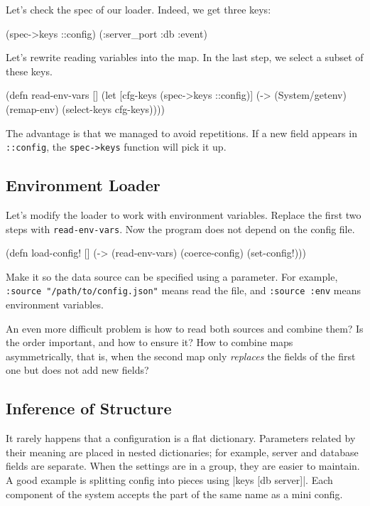 \fi

\noindent
Let's check the spec of our loader. Indeed, we get three keys:

\begin{clojure}
(spec->keys ::config)
(:server_port :db :event)
\end{clojure}

\noindent
Let's rewrite reading variables into the map. In the last step, we select a subset of these keys.

\begin{clojure}
(defn read-env-vars []
  (let [cfg-keys (spec->keys ::config)]
    (-> (System/getenv)
        (remap-env)
        (select-keys cfg-keys))))
\end{clojure}

The advantage is that we managed to avoid repetitions. If a new field appears in \verb|::config|, the \verb|spec->keys| function will pick it up.

\subsection{Environment Loader}

Let's modify the loader to work with environment variables. Replace the first two steps with \verb|read-env-vars|. Now the program does not depend on the config file.

\begin{clojure}
(defn load-config! []
  (-> (read-env-vars)
      (coerce-config)
      (set-config!)))
\end{clojure}

Make it so the data source can be specified using a parameter. For example, \verb|:source "/path/to/config.json"| means read the file, and \verb|:source :env| means environment variables.


An even more difficult problem is how to read both sources and combine them? Is
the order important, and how to ensure it? How to combine maps asymmetrically,
that is, when the second map only \emph{replaces} the fields of the first one
but does not add new fields?

\subsection{Inference of Structure}


It rarely happens that a configuration is a flat dictionary. Parameters related by their meaning are placed in nested dictionaries; for example, server and database fields are separate. When the settings are in a group, they are easier to maintain. A good example is splitting config into pieces using \spverb|{keys [db server]}|. Each component of the system accepts the part of the same name as a mini config.


